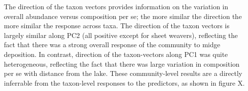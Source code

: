 The direction of the taxon vectors provides information on the variation in overall
abundance versus composition per se; the more similar the direction the more
similar the response across taxa.
The direction of the taxon vectors is largely similar along PC2 (all positive
except for sheet weavers), reflecting the fact that there was a strong overall
response of the community to midge deposition.
In contrast, direction of the taxon-vectors along PC1 was quite heterogeneous,
reflecting the fact that there was large variation in composition per se with
distance from the lake.
These community-level results are a directly inferrable from the
taxon-level responses to the predictors, as shown in figure X.
